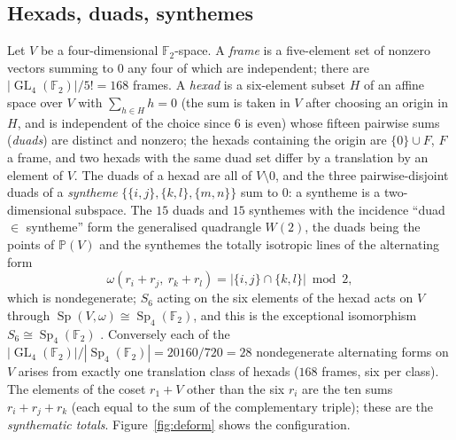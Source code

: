\documentclass[12pt,a4paper]{amsart}
\theoremstyle{definition}
\newcommand{\F}{\mathbb{F}}
\newcommand{\Sp}{\operatorname{Sp}}
\newcommand{\GL}{\operatorname{GL}}
\begin{document}
\subsection{Hexads, duads, synthemes}\label{subsec:hexads}
Let $V$ be a four-dimensional $\F_2$-space. A \emph{frame} is a five-element set of nonzero vectors summing to $0$ any four of which are independent; there are $|\GL_4(\F_2)|/5!=168$ frames. A \emph{hexad} is a six-element subset $H$ of an affine space over $V$ with $\sum_{h\in H}h=0$ (the sum is taken in $V$ after choosing an origin in $H$, and is independent of the choice since $6$ is even) whose fifteen pairwise sums (\emph{duads}) are distinct and nonzero; the hexads containing the origin are $\{0\}\cup F$, $F$ a frame, and two hexads with the same duad set differ by a translation by an element of $V$. The duads of a hexad are all of $V\setminus0$, and the three pairwise-disjoint duads of a \emph{syntheme} $\{\{i,j\},\{k,l\},\{m,n\}\}$ sum to $0$: a syntheme is a two-dimensional subspace. The $15$ duads and $15$ synthemes with the incidence ``duad $\in$ syntheme'' form the generalised quadrangle $W(2)$, the duads being the points of $\mathbb P(V)$ and the synthemes the totally isotropic lines of the alternating form
\begin{equation}\label{eq:omega}
\omega(r_i+r_j,\ r_k+r_l)=|\{i,j\}\cap\{k,l\}|\bmod2 ,
\end{equation}
which is nondegenerate; $S_6$ acting on the six elements of the hexad acts on $V$ through $\Sp(V,\omega)\cong\Sp_4(\F_2)$, and this is the exceptional isomorphism $S_6\cong\Sp_4(\F_2)$ \cite{Conway}. Conversely each of the $|\GL_4(\F_2)|/|\Sp_4(\F_2)|=20160/720=28$ nondegenerate alternating forms on $V$ arises from exactly one translation class of hexads ($168$ frames, six per class). The elements of the coset $r_1+V$ other than the six $r_i$ are the ten sums $r_i+r_j+r_k$ (each equal to the sum of the complementary triple); these are the \emph{synthematic totals}. Figure~\ref{fig:deform} shows the configuration.
\end{document}
